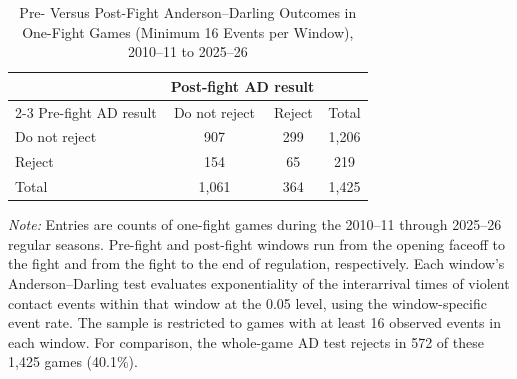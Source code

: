 \begin{table}[htbp]
\centering
\caption{Pre- Versus Post-Fight Anderson--Darling Outcomes in One-Fight Games (Minimum 16 Events per Window), 2010--11 to 2025--26}
\label{tab:one_fight_AD_rejection_min_16_20102011_20252026}
\small
\renewcommand{\arraystretch}{1.15}
\setlength{\tabcolsep}{6pt}

\begin{tabular*}{0.78\textwidth}{@{\extracolsep{\fill}}lccc}
\toprule
 & \multicolumn{2}{c}{Post-fight AD result} & \\
\cmidrule(lr){2-3}
Pre-fight AD result & Do not reject & Reject & Total \\
\midrule
Do not reject & 907 & 299 & 1,206 \\
Reject & 154 & 65 & 219 \\
\midrule
Total & 1,061 & 364 & 1,425 \\
\bottomrule
\end{tabular*}

\vspace{0.4em}
\parbox{0.78\textwidth}{
\footnotesize
\textit{Note:} Entries are counts of one-fight games during the 2010--11 through 2025--26 regular seasons. Pre-fight and post-fight windows run from the opening faceoff to the fight and from the fight to the end of regulation, respectively. Each window's Anderson--Darling test evaluates exponentiality of the interarrival times of violent contact events within that window at the 0.05 level, using the window-specific event rate. The sample is restricted to games with at least 16 observed events in each window. For comparison, the whole-game AD test rejects in 572 of these 1,425 games (40.1\%).
}
\end{table}
